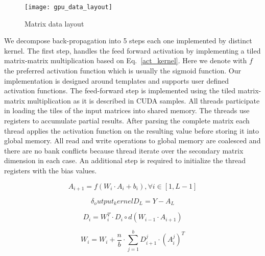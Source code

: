 \begin{figure}[ht]
\begin{center}
\centerline{\texttt{[image: gpu\_data\_layout]}}
\caption{Matrix data layout}
\label{fig:data_layout}
\end{center}
\vskip -0.2in
\end{figure}

We decompose back-propagation into 5 steps each one implemented by distinct kernel. The first step, handles the feed forward activation by implementing a tiled matrix-matrix multiplication based on Eq.~\ref{act_kernel}. Here we denote with $f$ the preferred activation function which is usually the sigmoid function. Our implementation is designed around templates and supports user defined activation functions. The feed-forward step is implemented using the tiled matrix-matrix multiplication as it is described in CUDA samples. All threads participate in loading the tiles of the input matrices into shared memory. The threads use registers to accumulate partial results. After parsing the complete matrix each thread applies the activation function on the resulting value before storing it into global memory. All read and write operations to global memory are coalesced and there are no bank conflicts because thread iterate over the secondary matrix dimension in each case. An additional step is required to initialize the thread registers with the bias values.

\begin{equation}\label{act_kernel}
A_{i+1} = f\left(W_{i} \cdot A_{i} + b_i\right), \forall i \in \left[1,L-1\right]
\end{equation}

\begin{equation}\delta_output_kernel
D_{L} = Y - A_{L}
\end{equation}

\begin{equation}\label{delta_kernel}
D_{i} = W_{i}^T \cdot D_{i} \circ d(W_{i-1} \cdot A_{i+1})
\end{equation}

\begin{equation}\label{update_kernel}
W_{i} = W_{i} + \frac{n}{b} \cdot \sum_{j=1}^{b} D_{i+1}^{j} \cdot (A_{i}^j)^T
\end{equation}

